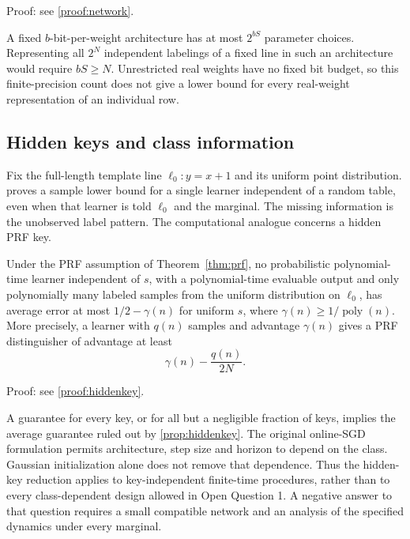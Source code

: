 \noindent Proof: see \cref{proof:network}.\par

A fixed $b$-bit-per-weight architecture has at most $2^{bS}$ parameter choices. Representing all $2^N$ independent labelings of a fixed line in such an architecture would require $bS\ge N$. Unrestricted real weights have no fixed bit budget, so this finite-precision count does not give a lower bound for every real-weight representation of an individual row.

\subsection{Hidden keys and class information}\label{sec:secret}
Fix the full-length template line $\ell_0:y=x+1$ and its uniform point distribution.  proves a sample lower bound for a single learner independent of a random table, even when that learner is told $\ell_0$ and the marginal. The missing information is the unobserved label pattern. The computational analogue concerns a hidden PRF key.

\begin{proposition}\label{prop:hiddenkey}
Under the PRF assumption of Theorem~\ref{thm:prf}, no probabilistic polynomial-time learner independent of $s$, with a polynomial-time evaluable output and only polynomially many labeled samples from the uniform distribution on $\ell_0$, has average error at most $1/2-\gamma(n)$ for uniform $s$, where $\gamma(n)\ge1/\operatorname{poly}(n)$. More precisely, a learner with $q(n)$ samples and advantage $\gamma(n)$ gives a PRF distinguisher of advantage at least
\[
 \gamma(n)-\frac{q(n)}{2N}.
\]
\end{proposition}

\noindent Proof: see \cref{proof:hiddenkey}.\par

A guarantee for every key, or for all but a negligible fraction of keys, implies the average guarantee ruled out by \cref{prop:hiddenkey}. The original online-SGD formulation permits architecture, step size and horizon to depend on the class. Gaussian initialization alone does not remove that dependence. Thus the hidden-key reduction applies to key-independent finite-time procedures, rather than to every class-dependent design allowed in Open Question 1. A negative answer to that question requires a small compatible network and an analysis of the specified dynamics under every marginal.
